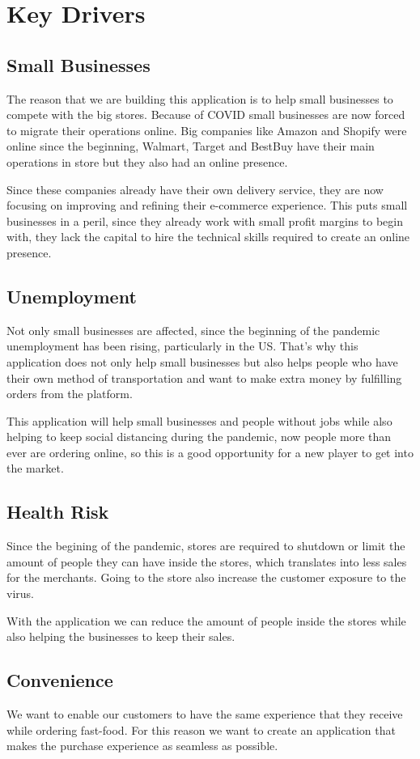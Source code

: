 \section{Key Drivers}
\subsection{Small Businesses}
The reason that we are building this application is to help small 
businesses to compete with the big stores. Because of COVID small businesses 
are now forced to migrate their operations online. Big companies like Amazon 
and Shopify were online since the beginning, Walmart, Target and BestBuy 
have their main operations in store but they also had an online 
presence. \newline

\noindent Since these companies already have their own delivery service, 
they are now focusing on improving and refining their e-commerce experience. 
This puts small businesses in a peril, since they already work with small 
profit margins to begin with, they lack the capital to hire the technical 
skills required to create an online presence. \newline

\subsection{Unemployment}
\noindent Not only small businesses are affected, since the beginning of 
the pandemic unemployment has been rising, particularly in the US. That’s why 
this application does not only help small businesses but also helps people 
who have their own method of transportation and want to make extra money 
by fulfilling orders from the platform.\newline

\noindent This application will help small businesses and people without jobs 
while also helping to keep social distancing during the pandemic, 
now people more than ever are ordering online, so this is a good opportunity 
for a new player to get into the market.

\subsection{Health Risk}
\noindent Since the begining of the pandemic, stores are required to shutdown 
or limit the amount of people they can have inside the stores, which translates 
into less sales for the merchants. Going to the store also increase the 
customer exposure to the virus. \newline

\noindent With the application we can reduce the amount of people inside the 
stores while also helping the businesses to keep their sales.

\pagebreak

\subsection{Convenience}
\noindent We want to enable our customers to have the same experience that 
they receive while ordering fast-food. For this reason we want to create 
an application that makes the purchase experience as seamless as possible.